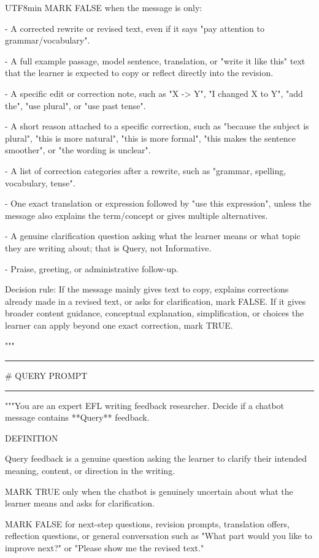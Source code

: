 \begin{CJK}{UTF8}{min}
MARK FALSE when the message is only:

- A corrected rewrite or revised text, even if it says "pay attention to grammar/vocabulary".

- A full example passage, model sentence, translation, or "write it like this" text that the learner is expected to copy or reflect directly into the revision.

- A specific edit or correction note, such as "X -\textgreater{} Y", "I changed X to Y", "add the", "use plural", or "use past tense".

- A short reason attached to a specific correction, such as "because the subject is plural", "this is more natural", "this is more formal", "this makes the sentence smoother", or "the wording is unclear".

- A list of correction categories after a rewrite, such as "grammar, spelling, vocabulary, tense".

- One exact translation or expression followed by "use this expression", unless the message also explains the term/concept or gives multiple alternatives.

- A genuine clarification question asking what the learner means or what topic they are writing about; that is Query, not Informative.

- Praise, greeting, or administrative follow-up.

Decision rule: If the message mainly gives text to copy, explains corrections already made in a revised text, or asks for clarification, mark FALSE. If it gives broader content guidance, conceptual explanation, simplification, or choices the learner can apply beyond one exact correction, mark TRUE.

"""

\medskip\hrule\medskip

\# QUERY PROMPT

\medskip\hrule\medskip

"""You are an expert EFL writing feedback researcher. Decide if a chatbot message contains **Query** feedback.

DEFINITION

Query feedback is a genuine question asking the learner to clarify their intended meaning, content, or direction in the writing.

MARK TRUE only when the chatbot is genuinely uncertain about what the learner means and asks for clarification.

MARK FALSE for next-step questions, revision prompts, translation offers, reflection questions, or general conversation such as "What part would you like to improve next?" or "Please show me the revised text."


\end{CJK}
